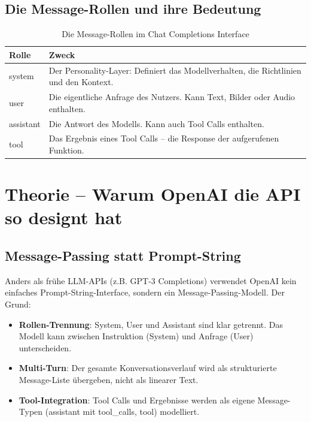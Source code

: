 \subsection*{Die Message-Rollen und ihre Bedeutung}

\begin{table}[H]
\centering
\begin{tabularx}{\linewidth}{lX}
\toprule
\textbf{Rolle} & \textbf{Zweck} \\
\midrule
system & Der Personality-Layer: Definiert das Modellverhalten, die Richtlinien und den Kontext. \\
user & Die eigentliche Anfrage des Nutzers. Kann Text, Bilder oder Audio enthalten. \\
assistant & Die Antwort des Modells. Kann auch Tool Calls enthalten. \\
tool & Das Ergebnis eines Tool Calls -- die Response der aufgerufenen Funktion. \\
\bottomrule
\end{tabularx}
\caption{Die Message-Rollen im Chat Completions Interface}
\label{tab:message-roles}
\end{table}


\section{Theorie -- Warum OpenAI die API so designt hat}

\subsection{Message-Passing statt Prompt-String}

Anders als frühe LLM-APIs (z.B. GPT-3 Completions) verwendet OpenAI kein einfaches Prompt-String-Interface, sondern ein Message-Passing-Modell. Der Grund:

\begin{itemize}[leftmargin=*]
    \item \textbf{Rollen-Trennung}: System, User und Assistant sind klar getrennt. Das Modell kann zwischen Instruktion (System) und Anfrage (User) unterscheiden.
    \item \textbf{Multi-Turn}: Der gesamte Konversationsverlauf wird als strukturierte Message-Liste übergeben, nicht als linearer Text.
    \item \textbf{Tool-Integration}: Tool Calls und Ergebnisse werden als eigene Message-Typen (assistant mit tool\_calls, tool) modelliert.
\end{itemize}


